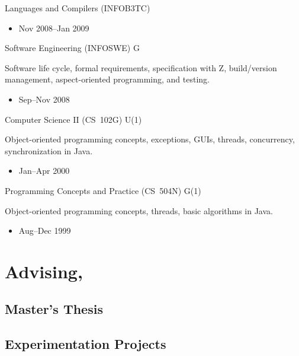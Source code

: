 \documentclass[11pt,a4paper,roman]{moderncv}
\begin{document}
\cventry%
{}%
{Languages and Compilers (INFOB3TC)}%
{\uu}%
{}%
{}%
{\begin{itemize}
\item Nov 2008--Jan 2009
\end{itemize}}

\cventry%
{}%
{Software Engineering (INFOSWE)}%
{\uu}%
{}%
{G}%
{Software life cycle, formal requirements, specification with Z, build/version management, aspect-oriented programming, and testing.
\begin{itemize}
\item Sep--Nov 2008
\end{itemize}}

\cventry%
{}%
{Computer Science II (CS~102G)}%
{\wustl}%
{}%
{U(1)}%
{Object-oriented programming concepts, exceptions, GUIs, threads, concurrency, synchronization in Java.
\begin{itemize}
\item Jan--Apr 2000
\end{itemize}}

\cventry%
{}%
{Programming Concepts and Practice (CS~504N)}%
{\wustl}%
{}%
{G(1)}%
{Object-oriented programming concepts, threads, basic algorithms in Java.
\begin{itemize}
\item Aug--Dec 1999
\end{itemize}}


\section{Advising, \uu}

\subsection{Master's Thesis}


\subsection{Experimentation Projects}
\end{document}
